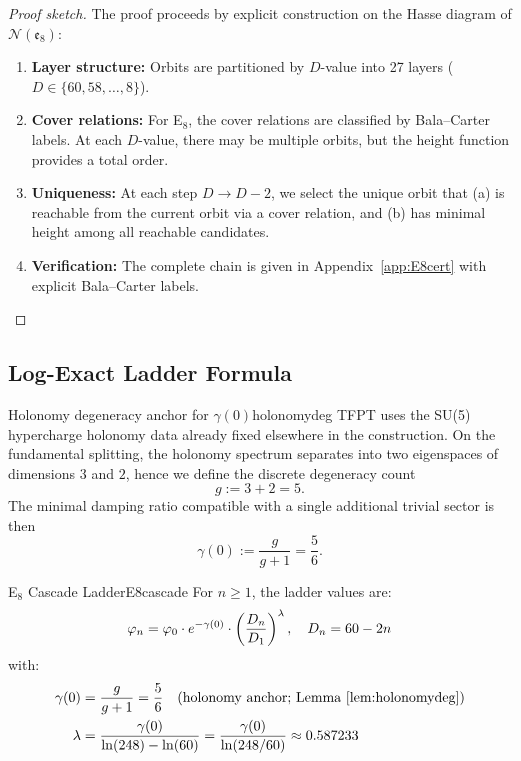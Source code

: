 \begin{proof}[Proof sketch]
The proof proceeds by explicit construction on the Hasse diagram of 
$\mathcal{N}(\mathfrak{e}_8)$:
\begin{enumerate}[leftmargin=1.5em, topsep=2pt, itemsep=1pt]
    \item \textbf{Layer structure:} Orbits are partitioned by $D$-value into 
        27 layers ($D \in \{60, 58, \ldots, 8\}$).
    \item \textbf{Cover relations:} For E$_8$, the cover relations are classified 
        by Bala--Carter labels. At each $D$-value, there may be multiple orbits, 
        but the height function provides a total order.
    \item \textbf{Uniqueness:} At each step $D \to D-2$, we select the unique 
        orbit that (a) is reachable from the current orbit via a cover relation, 
        and (b) has minimal height among all reachable candidates.
    \item \textbf{Verification:} The complete chain is given in Appendix~\ref{app:E8cert} 
        with explicit Bala--Carter labels.
\end{enumerate}
\end{proof}

\subsection{Log-Exact Ladder Formula}

\begin{lemma}{Holonomy degeneracy anchor for $\gamma(0)$}{holonomydeg}
TFPT uses the SU(5) hypercharge holonomy data already fixed elsewhere in the construction.
On the fundamental splitting, the holonomy spectrum separates into two eigenspaces of dimensions $3$ and $2$, hence we define the discrete degeneracy count
\[
g:=3+2=5.
\]
The minimal damping ratio compatible with a single additional trivial sector is then
\[
\gamma(0):=\frac{g}{g+1}=\frac56.
\]
\end{lemma}

\begin{definition}{E$_8$ Cascade Ladder}{E8cascade}
For $n \geq 1$, the ladder values are:
\begin{equation}
    \varphi_n = \varphi_0 \cdot e^{-\gamma(0)} \cdot 
        \left(\frac{D_n}{D_1}\right)^\lambda, \quad D_n = 60 - 2n
    \label{eq:ladder}
\end{equation}
with:
\begin{align}
    \gamma(0) &= \frac{g}{g+1}=\frac{5}{6} \quad \text{(holonomy anchor; Lemma~\ref{lem:holonomydeg})}\\
    \lambda &= \frac{\gamma(0)}{\ln(248) - \ln(60)} = \frac{\gamma(0)}{\ln(248/60)} 
        \approx 0.587233
\end{align}
\end{definition}

